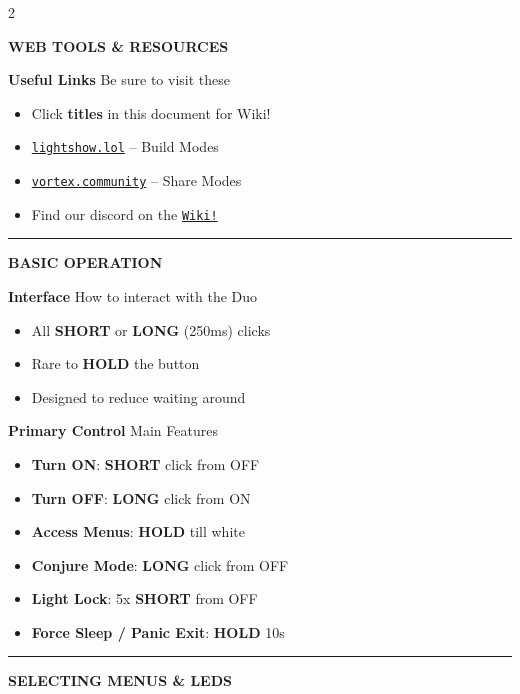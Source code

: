 \documentclass[9pt,a5paper]{article}
\newcommand{\tsection}[1]{\vspace{4pt}\noindent\textbf{\color{twhite}\large #1}\vspace{2pt}}
\newcommand{\desc}[1]{\textcolor{tgray}{#1}}
\newcommand{\sectiondivider}{\vspace{2mm}\noindent\textcolor{sectionline}{\rule{\linewidth}{0.5pt}}\vspace{0mm}}
\newcommand{\sectiontitle}[1]{\vspace{1mm}\noindent\textbf{\color{purple}\large #1}\vspace{0.5mm}}
\begin{document}
\begin{multicols}{2}

\sectiontitle{WEB TOOLS \& RESOURCES}

\tsection{Useful Links}
\desc{Be sure to visit these}
\begin{itemize}
    \item Click \textbf{titles} in this document for Wiki!
    \item \href{https://lightshow.lol}{\texttt{lightshow.lol}} -- Build Modes
    \item \href{https://vortex.community}{\texttt{vortex.community}} -- Share Modes
    \item Find our discord on the \href{https://stoneorbits.github.io/VortexEngine/support/index.html}{\texttt{Wiki!}}
\end{itemize}

\sectiondivider

\sectiontitle{BASIC OPERATION}

\tsection{Interface}
\desc{How to interact with the Duo}
\begin{itemize}
    \item All \textbf{SHORT} or \textbf{LONG} (250ms) clicks
    \item Rare to \textbf{HOLD} the button
    \item Designed to reduce waiting around
\end{itemize}
\vspace{3pt}

\tsection{Primary Control}
\desc{Main Features}
\begin{itemize}
  \item \textbf{Turn ON}: \textbf{SHORT} click from OFF
  \item \textbf{Turn OFF}: \textbf{LONG} click from ON
  \item \textbf{Access Menus}: \textbf{HOLD} till white
  \item \textbf{Conjure Mode}: \textbf{LONG} click from OFF
  \item \textbf{Light Lock}: 5x \textbf{SHORT} from OFF
  \item \textbf{Force Sleep / Panic Exit}: \textbf{HOLD} 10s
\end{itemize}

\sectiondivider

\sectiontitle{SELECTING MENUS \& LEDS}


\end{multicols}
\end{document}
